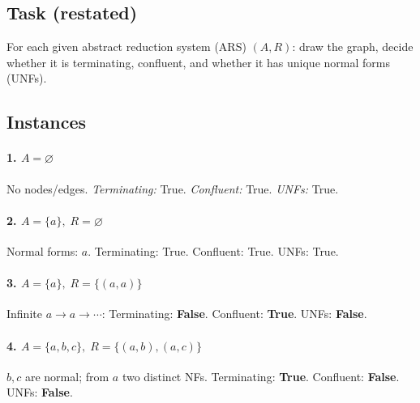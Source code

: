 \documentclass[11pt]{article}
\newcommand{\ARSnode}[1]{%
  \node[circle,draw,minimum size=7mm,inner sep=0pt] (#1) {$#1$};%
}
\newcommand{\ARSnodeat}[2]{%
  \node[circle,draw,minimum size=7mm,inner sep=0pt, #2] (#1) {$#1$};%
}
\begin{document}
\subsection*{Task (restated)}
For each given abstract reduction system (ARS) $(A,R)$: draw the graph, decide
whether it is terminating, confluent, and whether it has unique normal forms (UNFs).

\subsection*{Instances}

\paragraph{1.\; $A=\varnothing$}
No nodes/edges. \emph{Terminating:} True. \emph{Confluent:} True. \emph{UNFs:} True.

\paragraph{2.\; $A=\{a\},\; R=\varnothing$}

Normal forms: $a$. Terminating: True. Confluent: True. UNFs: True.

\paragraph{3.\; $A=\{a\},\; R=\{(a,a)\}$}

Infinite $a\to a\to\cdots$: Terminating: \textbf{False}. Confluent: \textbf{True}. UNFs: \textbf{False}.

\paragraph{4.\; $A=\{a,b,c\},\; R=\{(a,b),(a,c)\}$}

$b,c$ are normal; from $a$ two distinct NFs. Terminating: \textbf{True}. Confluent: \textbf{False}. UNFs: \textbf{False}.
\end{document}
